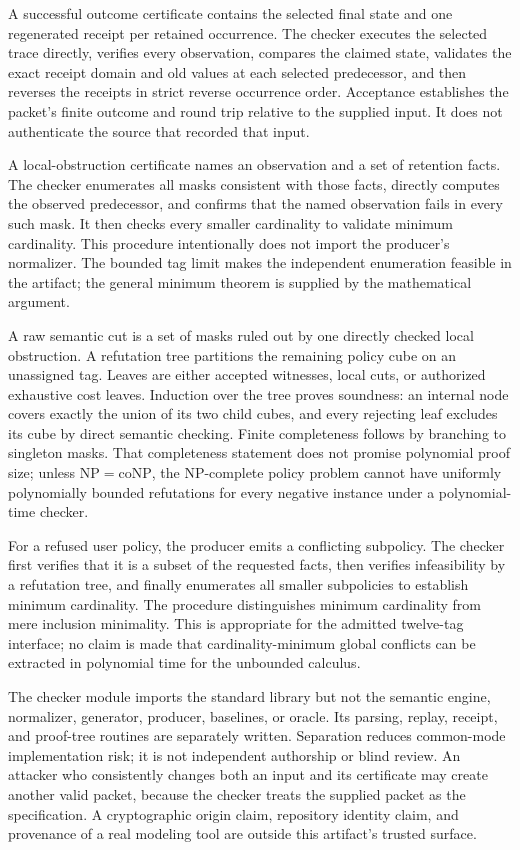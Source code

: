 A successful outcome certificate contains the selected final state and one regenerated
receipt per retained occurrence.  The checker executes the selected trace directly,
verifies every observation, compares the claimed state, validates the exact receipt
domain and old values at each selected predecessor, and then reverses the receipts in
strict reverse occurrence order.  Acceptance establishes the packet's finite outcome
and round trip relative to the supplied input.  It does not authenticate the source
that recorded that input.

A local-obstruction certificate names an observation and a set of retention facts.
The checker enumerates all masks consistent with those facts, directly computes the
observed predecessor, and confirms that the named observation fails in every such
mask.  It then checks every smaller cardinality to validate minimum cardinality.  This
procedure intentionally does not import the producer's normalizer.  The bounded tag
limit makes the independent enumeration feasible in the artifact; the general
minimum theorem is supplied by the mathematical argument.

A raw semantic cut is a set of masks ruled out by one directly checked local
obstruction.  A refutation tree partitions the remaining policy cube on an unassigned
tag.  Leaves are either accepted witnesses, local cuts, or authorized exhaustive cost
leaves.  Induction over the tree proves soundness: an internal node covers exactly the
union of its two child cubes, and every rejecting leaf excludes its cube by direct
semantic checking.  Finite completeness follows by branching to singleton masks.
That completeness statement does not promise polynomial proof size; unless
$\mathrm{NP}=\mathrm{coNP}$, the NP-complete policy problem cannot have uniformly
polynomially bounded refutations for every negative instance under a polynomial-time
checker.

For a refused user policy, the producer emits a conflicting subpolicy.  The checker
first verifies that it is a subset of the requested facts, then verifies infeasibility
by a refutation tree, and finally enumerates all smaller subpolicies to establish
minimum cardinality.  The procedure distinguishes minimum cardinality from mere
inclusion minimality.  This is appropriate for the admitted twelve-tag interface;
no claim is made that cardinality-minimum global conflicts can be extracted in
polynomial time for the unbounded calculus.

The checker module imports the standard library but not the semantic engine,
normalizer, generator, producer, baselines, or oracle.  Its parsing, replay, receipt,
and proof-tree routines are separately written.  Separation reduces common-mode
implementation risk; it is not independent authorship or blind review.  An attacker
who consistently changes both an input and its certificate may create another valid
packet, because the checker treats the supplied packet as the specification.  A
cryptographic origin claim, repository identity claim, and provenance of a real
modeling tool are outside this artifact's trusted surface.

